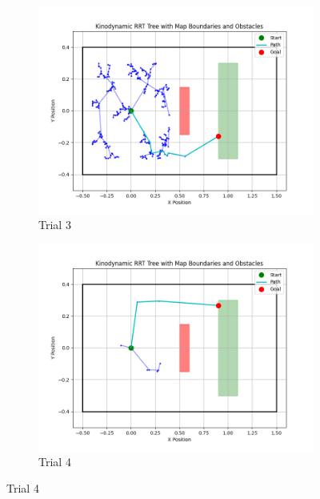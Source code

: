 \documentclass[12pt]{article}
\begin{document}
\begin{figure}[h!]
    \begin{subfigure}{0.45\textwidth}
        \centering
        \includegraphics[width=\textwidth]{./images/tree3.png}
        \caption{Trial 3}
        \label{fig:tree_3}
    \end{subfigure}
    \hfill
    \begin{subfigure}{0.45\textwidth}
        \centering
        \includegraphics[width=\textwidth]{./images/tree4.png}
        \caption{Trial 4}
        \label{fig:tree_4}
    \end{subfigure}


\end{figure}
\end{document}
